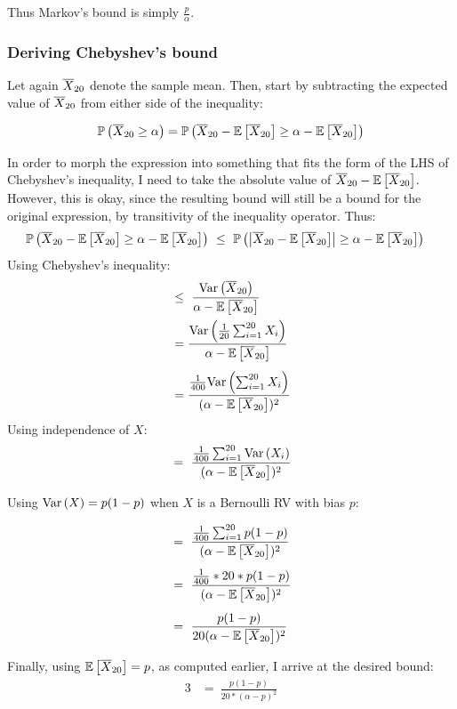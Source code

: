 Thus Markov's bound is simply $\frac{p}{\alpha}$.

\subsubsection{Deriving Chebyshev's bound}

Let again $\overline{X}_{20}$ denote the sample mean. Then, start by subtracting the
expected value of $\overline{X}_{20}$ from either side of the inequality:

\begin{align*}
  \mathbb P \left(\overline{X}_{20} \geq \alpha\right) &= \mathbb P \left(\overline{X}_{20} - \mathbb E \left[\overline{X}_{20}\right] \geq \alpha - \mathbb E \left[\overline{X}_{20}\right]\right)\\
\end{align*}

In order to morph the expression into something that fits the form of the LHS of Chebyshev's
inequality, I need to take the absolute value of $\overline{X}_{20} - \mathbb E \left[\overline{X}_{20}\right]$. However,
this is okay, since the resulting bound will still be a bound for the original
expression, by transitivity of the inequality operator. Thus:
\begin{align*}
  \PP{\xbar - \EE{\xbar} \geq \alpha - \EE{\xbar}}\ &\leq\ \PP{\left|\xbar -
  \EE{\xbar}\right| \geq \alpha - \EE{\xbar}}
\end{align*}
Using Chebyshev's inequality:
\begin{align*}
  &\leq\  \frac{\text{Var}\left(\overline{X}_{20}\right)}{\alpha - \mathbb E \left[\overline{X}_{20}\right]}\\
  &= \frac{\text{Var}\left(\frac{1}{20}\sum_{i = 1}^{20} X_i\right)}{\alpha - \mathbb E \left[\overline{X}_{20}\right]}\\[4pt]
  &= \frac{\tfrac{1}{400}\text{Var}\left(\sum_{i = 1}^{20}X_i\right)}{(\alpha - \mathbb E \left[\overline{X}_{20}\right])^2}
\end{align*}
Using independence of $X$:
\begin{alignat*}{3}
  &=\ \frac{\tfrac{1}{400}\sum_{i = 1}^{20}\text{Var}\left(X_i\right)}{(\alpha - \mathbb E \left[\overline{X}_{20}\right])^2}\\
\end{alignat*}

Using $\text{Var}\left(X\right) = p(1 - p)$ when $X$ is a Bernoulli RV with bias $p$:

\begin{alignat*}{3}
  &=\ \frac{\tfrac{1}{400}\sum_{i = 1}^{20}p(1 - p)}{(\alpha -
  \mathbb E \left[\overline{X}_{20}\right])^2}\\[4pt]
  &=\ \frac{\tfrac{1}{400}* 20 * p(1 - p)}{(\alpha - \mathbb E \left[\overline{X}_{20}\right])^2}\\[4pt]
  &=\ \frac{p(1 - p)}{20(\alpha - \mathbb E \left[\overline{X}_{20}\right])^2}
\end{alignat*}

\noindent Finally, using $\mathbb E \left[\overline{X}_{20}\right] = p$, as computed earlier, I arrive at the desired
bound:
\begin{alignat*}{3}
  &=\ \frac{p(1 - p)}{20 *(\alpha - p)^2}
\end{alignat*}

